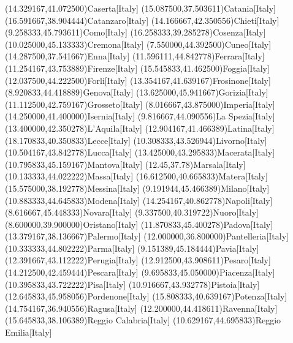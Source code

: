 \mapput[90](14.329167,41.072500){Caserta}[Italy]
\mapput[90](15.087500,37.503611){Catania}[Italy]
\mapput[90](16.591667,38.904444){Catanzaro}[Italy]
\mapput[90](14.166667,42.350556){Chieti}[Italy]
\mapput[90](9.258333,45.793611){Como}[Italy]
\mapput[90](16.258333,39.285278){Cosenza}[Italy]
\mapput[90](10.025000,45.133333){Cremona}[Italy]
\mapput[90](7.550000,44.392500){Cuneo}[Italy]
\mapput[90](14.287500,37.541667){Enna}[Italy]
\mapput[90](11.596111,44.842778){Ferrara}[Italy]
\mapput[90](11.254167,43.753889){Firenze}[Italy]
\mapput[90](15.545833,41.462500){Foggia}[Italy]
\mapput[90](12.037500,44.222500){Forli}[Italy]
\mapput[90](13.354167,41.639167){Frosinone}[Italy]
\mapput[90](8.920833,44.418889){Genova}[Italy]
\mapput[90](13.625000,45.941667){Gorizia}[Italy]
\mapput[90](11.112500,42.759167){Grosseto}[Italy]
\mapput[90](8.016667,43.875000){Imperia}[Italy]
\mapput[90](14.250000,41.400000){Isernia}[Italy]
\mapput[90](9.816667,44.090556){La Spezia}[Italy]
\mapput[90](13.400000,42.350278){L'Aquila}[Italy]
\mapput[90](12.904167,41.466389){Latina}[Italy]
\mapput[90](18.170833,40.350833){Lecce}[Italy]
\mapput[90](10.308333,43.526944){Livorno}[Italy]
\mapput[90](10.504167,43.842778){Lucca}[Italy]
\mapput[90](13.425000,43.295833){Macerata}[Italy]
\mapput[90](10.795833,45.159167){Mantova}[Italy]
\mapput[0](12.45,37.78){Marsala}[Italy]
\mapput[90](10.133333,44.022222){Massa}[Italy]
\mapput[90](16.612500,40.665833){Matera}[Italy]
\mapput[90](15.575000,38.192778){Messina}[Italy]
\mapput[90](9.191944,45.466389){Milano}[Italy]
\mapput[-90](10.883333,44.645833){Modena}[Italy]
\mapput[90](14.254167,40.862778){Napoli}[Italy]
\mapput[90](8.616667,45.448333){Novara}[Italy]
\mapput[90](9.337500,40.319722){Nuoro}[Italy]
\mapput[90](8.600000,39.900000){Oristano}[Italy]
\mapput[90](11.870833,45.400278){Padova}[Italy]
\mapput[90](13.379167,38.136667){Palermo}[Italy]
\mapput[90](12.000000,36.800000){Pantelleria}[Italy]
\mapput[90](10.333333,44.802222){Parma}[Italy]
\mapput[90](9.151389,45.184444){Pavia}[Italy]
\mapput[90](12.391667,43.112222){Perugia}[Italy]
\mapput[0](12.912500,43.908611){Pesaro}[Italy]
\mapput[90](14.212500,42.459444){Pescara}[Italy]
\mapput[90](9.695833,45.050000){Piacenza}[Italy]
\mapput[90](10.395833,43.722222){Pisa}[Italy]
\mapput[90](10.916667,43.932778){Pistoia}[Italy]
\mapput[90](12.645833,45.958056){Pordenone}[Italy]
\mapput[90](15.808333,40.639167){Potenza}[Italy]
\mapput[0](14.754167,36.940556){Ragusa}[Italy]
\mapput[90](12.200000,44.418611){Ravenna}[Italy]
\mapput[0](15.645833,38.106389){Reggio Calabria}[Italy]
\mapput[50](10.629167,44.695833){Reggio Emilia}[Italy]
